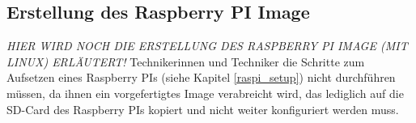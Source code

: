 \subsection{Erstellung des Raspberry PI Image}
\textit{HIER WIRD NOCH DIE ERSTELLUNG DES RASPBERRY PI IMAGE (MIT LINUX) ERLÄUTERT!}
Technikerinnen und Techniker die Schritte zum Aufsetzen eines Raspberry PIs (siehe Kapitel \ref{raspi_setup}) nicht durchführen müssen, da ihnen ein vorgefertigtes Image verabreicht wird, das lediglich auf die SD-Card des Raspberry PIs kopiert und nicht weiter konfiguriert werden muss.